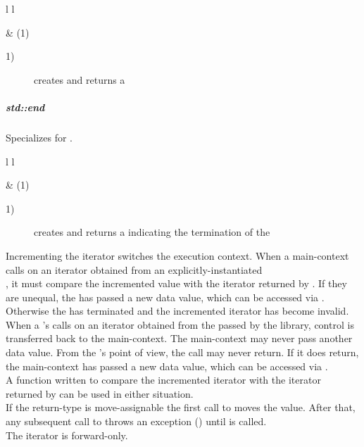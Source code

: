 \begin{tabular}{ l l }
    \midrule

     & (1)\\

    \midrule
\end{tabular}

\begin{description}
    \item[1)] creates and returns a \\
\end{description}

\subparagraph*{std::end}
Specializes  for \pullcoro.\\

\begin{tabular}{ l l }
    \midrule

     & (1)\\

    \midrule
\end{tabular}

\begin{description}
    \item[1)] creates and returns a  indicating the termination of the \corofunction\\
\end{description}

Incrementing the iterator switches the execution context.
\newline
When a main-context calls  on an iterator obtained
from an explicitly-instantiated\\
\pullcoro, it must compare the incremented
value with the iterator returned by . If they are unequal, the
\corofunction has passed a new data value, which can be accessed via
. Otherwise the \corofunction has terminated and the
incremented iterator has become invalid.\\
When a \pushcoro's \corofunction calls  on an iterator
obtained from the \pullcoro passed by the library, control is transferred back
to the main-context. The main-context may never pass another data value. From
the \corofunction's point of view, the  call may
never return. If it does return, the main-context has passed a new data value,
which can be accessed via .\\
A function written to compare the incremented iterator with the iterator
returned by  can be used in either situation.\\
If the return-type is move-assignable the first call to 
moves the value. After that, any subsequent call to  throws an
exception () until  is called.\\
The iterator is forward-only.\\

